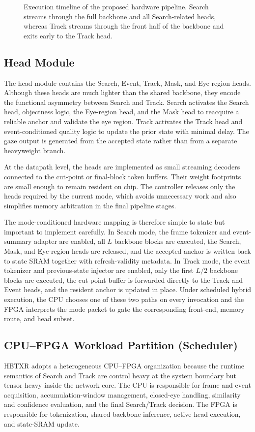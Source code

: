 \documentclass[journal]{IEEEtran}
\newcommand{\placeholderfigure}[2]{%
  \fbox{\parbox[c][#2][c]{#1}{\centering\vspace{2mm}\textbf{Figure placeholder}\\Final artwork pending\vspace{2mm}}}}
\begin{document}
\begin{figure}[t]
\centering
\placeholderfigure{0.93\textwidth}{1.95in}
\caption{Execution timeline of the proposed hardware pipeline. Search streams through the full backbone and all Search-related heads, whereas Track streams through the front half of the backbone and exits early to the Track head.}
\label{fig:hw_timeline}
\end{figure}

\subsection{Head Module}
The head module contains the Search, Event, Track, Mask, and Eye-region heads. Although these heads are much lighter than the shared backbone, they encode the functional asymmetry between Search and Track. Search activates the Search head, objectness logic, the Eye-region head, and the Mask head to reacquire a reliable anchor and validate the eye region. Track activates the Track head and event-conditioned quality logic to update the prior state with minimal delay. The gaze output is generated from the accepted state rather than from a separate heavyweight branch.

At the datapath level, the heads are implemented as small streaming decoders connected to the cut-point or final-block token buffers. Their weight footprints are small enough to remain resident on chip. The controller releases only the heads required by the current mode, which avoids unnecessary work and also simplifies memory arbitration in the final pipeline stages.

The mode-conditioned hardware mapping is therefore simple to state but important to implement carefully. In Search mode, the frame tokenizer and event-summary adapter are enabled, all $L$ backbone blocks are executed, the Search, Mask, and Eye-region heads are released, and the accepted anchor is written back to state SRAM together with refresh-validity metadata. In Track mode, the event tokenizer and previous-state injector are enabled, only the first $L/2$ backbone blocks are executed, the cut-point buffer is forwarded directly to the Track and Event heads, and the resident anchor is updated in place. Under scheduled hybrid execution, the CPU chooses one of these two paths on every invocation and the FPGA interprets the mode packet to gate the corresponding front-end, memory route, and head subset.

\subsection{CPU--FPGA Workload Partition (Scheduler)}
HBTXR adopts a heterogeneous CPU--FPGA organization because the runtime semantics of Search and Track are control heavy at the system boundary but tensor heavy inside the network core. The CPU is responsible for frame and event acquisition, accumulation-window management, closed-eye handling, similarity and confidence evaluation, and the final Search/Track decision. The FPGA is responsible for tokenization, shared-backbone inference, active-head execution, and state-SRAM update.
\end{document}

